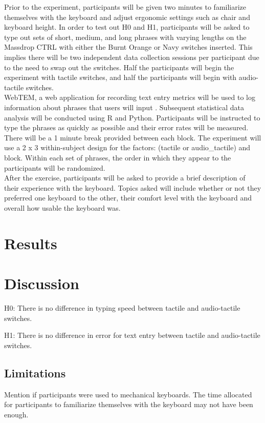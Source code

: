 \documentclass{sigchi}
\begin{document}
Prior to the experiment, participants will be given two minutes to familiarize themselves with the keyboard and adjust ergonomic settings such as chair and keyboard height. In order to test out H0 and H1, participants will be asked to type out sets of short, medium, and long phrases with varying lengths on the Massdrop CTRL with either the Burnt Orange or Navy switches inserted. This implies there will be two independent data collection sessions per participant due to the need to swap out the switches. Half the participants will begin the experiment with tactile switches, and half the participants will begin with audio-tactile switches. \\

WebTEM, a web application for recording text entry metrics will be used to log information about phrases that users will input \cite{arif:2016}. Subsequent statistical data analysis will be conducted using R and Python. Participants will be instructed to type the phrases as quickly as possible and their error rates will be measured. There will be a 1 minute break provided between each block. The experiment will use a 2 x 3 within-subject design for the factors: (tactile or audio\_tactile) and block. Within each set of phrases, the order in which they appear to the participants will be randomized.\\

After the exercise, participants will be asked to provide a brief description of their experience with the keyboard. Topics asked will include whether or not they preferred one keyboard to the other, their comfort level with the keyboard and overall how usable the keyboard was. \\

\section{Results}


\section{Discussion}
H0: There is no difference in typing speed between tactile and audio-tactile switches. 


H1: There is no difference in error for text entry between tactile and audio-tactile switches.

\subsection{Limitations}
Mention if participants were used to mechanical keyboards. The time allocated for participants to familiarize themselves with the keyboard may not have been enough. 
\end{document}

